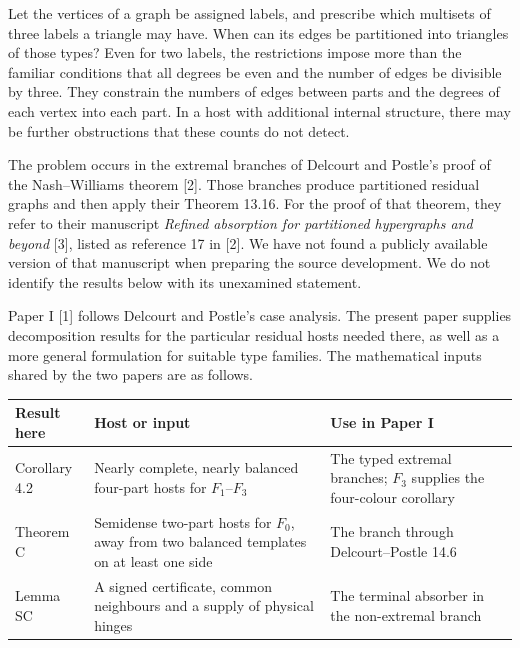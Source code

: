 \documentclass[english,11pt,a4paper]{article}
\begin{document}
Let the vertices of a graph be assigned labels, and prescribe which multisets of three labels a triangle may have. When can its edges be partitioned into triangles of those types? Even for two labels, the restrictions impose more than the familiar conditions that all degrees be even and the number of edges be divisible by three. They constrain the numbers of edges between parts and the degrees of each vertex into each part. In a host with additional internal structure, there may be further obstructions that these counts do not detect.

The problem occurs in the extremal branches of Delcourt and Postle's proof of the Nash--Williams theorem {[}2{]}. Those branches produce partitioned residual graphs and then apply their Theorem 13.16. For the proof of that theorem, they refer to their manuscript \emph{Refined absorption for partitioned hypergraphs and beyond} {[}3{]}, listed as reference 17 in {[}2{]}. We have not found a publicly available version of that manuscript when preparing the source development. We do not identify the results below with its unexamined statement.

Paper I {[}1{]} follows Delcourt and Postle's case analysis. The present paper supplies decomposition results for the particular residual hosts needed there, as well as a more general formulation for suitable type families. The mathematical inputs shared by the two papers are as follows.

{\begin{longtable}[]{@{}
  >{\raggedright\arraybackslash}p{}
  >{\raggedright\arraybackslash}p{}
  >{\raggedright\arraybackslash}p{}@{}}
\toprule\noalign{}
\begin{minipage}[b]{\linewidth}\raggedright
Result here
\end{minipage} & \begin{minipage}[b]{\linewidth}\raggedright
Host or input
\end{minipage} & \begin{minipage}[b]{\linewidth}\raggedright
Use in Paper I
\end{minipage} \\
\midrule\noalign{}
\endhead
\bottomrule\noalign{}
\endlastfoot
Corollary 4.2 & Nearly complete, nearly balanced four-part hosts for \(F_1\)--\(F_3\) & The typed extremal branches; \(F_3\) supplies the four-colour corollary \\
Theorem C & Semidense two-part hosts for \(F_0\), away from two balanced templates on at least one side & The branch through Delcourt--Postle 14.6 \\
Lemma SC & A signed certificate, common neighbours and a supply of physical hinges & The terminal absorber in the non-extremal branch \\
\end{longtable}
}
\end{document}
